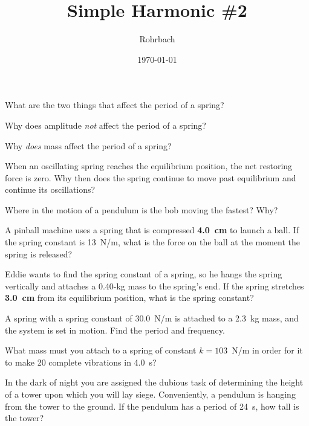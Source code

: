 \documentclass[10pt]{exam}
\title{Simple Harmonic \#2}
\author{Rohrbach}
\date{\today}
\begin{document}
\maketitle

\begin{questions}
\question
  What are the two things that affect the period of a spring?
  \vs

\question
  Why does amplitude \emph{not} affect the period of a spring?
  \vs

\question
  Why \emph{does} mass affect the period of a spring?
  \vs

\question
  When an oscillating spring reaches the equilibrium position, the net restoring force is zero.  Why then does the spring continue to move past equilibrium and continue its oscillations?
  \vs


\question
  Where in the motion of a pendulum is the bob moving the fastest?  Why?
  




\question
  A pinball machine uses a spring that is compressed {\bf 4.0~cm} to launch a ball.  If the spring constant is 13~N/m, what is the force on the ball at the moment the spring is released?
  \vs[2]



\pagebreak

\question
  Eddie wants to find the spring constant of a spring, so he hangs the spring vertically and attaches a 0.40-kg mass to the spring's end.  If the spring stretches {\bf 3.0~cm} from its equilibrium position, what is the spring constant?
  \vs

\question
  A spring with a spring constant of 30.0~N/m is attached to a 2.3~kg mass, and the system is set in motion.  Find the period and frequency.
  \vs

\question
  What mass must you attach to a spring of constant $k=103$~N/m in order for it to make 20 complete vibrations in 4.0~s?
  \vs[2]


\question 
  In the dark of night you are assigned the dubious task of determining the height of a tower upon which you will lay siege.  Conveniently, a pendulum is hanging from the tower to the ground.  If the pendulum has a period of 24~s, how tall is the tower?


\end{questions}
\end{document}
